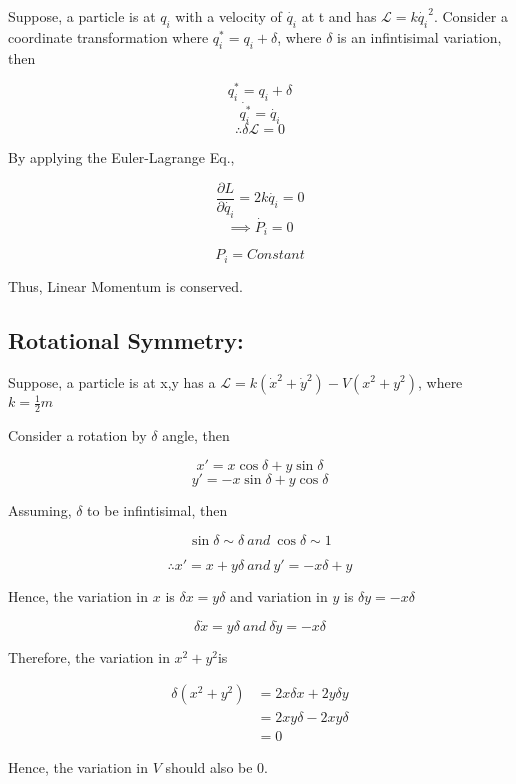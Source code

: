 \documentclass[a4paper]{article}
\newcommand{\Lagr}{\mathcal{L}}
\newcommand{\pdt}[2]{\frac{\partial #1}{\partial #2}}
\newcommand{\half}{\frac{1}{2}}
\begin{document}
			\noindent

			Suppose, a particle is at $q_i$ with a velocity of $\dot{q_i}$ at t and has $\Lagr = k\dot{q_i}^2$.
			Consider a coordinate transformation where $q_i^* = q_i + \delta$, where $\delta$ is an infintisimal variation, then
			
			$$ q_i^* = q_i + \delta $$
			$$ \dot{q_i^*} = \dot{q_i} $$
			$$\therefore \delta \Lagr = 0 $$

			By applying the Euler-Lagrange Eq., 

			$$ \pdt{L}{\dot{q_i}} = 2k\dot{q_i} = 0 $$
			$$\implies \dot{P_i} = 0 $$

			$$ P_i = Constant $$

			Thus, Linear Momentum is conserved.

		\subsection*{Rotational Symmetry: }

			\noindent

			Suppose, a particle is at x,y has a $\Lagr = k (\dot{x}^2 + \dot{y}^2) - V(x^2 + y^2)$, where $ k = \half m $	

			Consider a rotation by $\delta$ angle, then

			$$ x' = x\cos{\delta} + y\sin{\delta} $$
			$$ y' = -x\sin{\delta} + y\cos{\delta} $$

			Assuming, $\delta$ to be infintisimal, then

			$$ \sin{\delta} \sim \delta\ and\ \cos{\delta} \sim 1 $$

			$$\therefore x' = x + y\delta\ and\ y' = -x\delta + y $$

			Hence, the variation in $x$ is $\delta x = y \delta$ and variation in $y$ is $\delta y = -x \delta $

			$$ \delta \dot{x} = y \delta\ and\ \delta \dot{y} = - x \delta $$

			Therefore, the variation in $x^2 + y^2$is
			
			\begin{equation}
				\begin{split}	
					\delta (x^2 + y^2) & = 2 x \delta x + 2y \delta y \\
					&= 2 x y \delta - 2 x y \delta  \\
					& = 0
				\end{split}
			\end{equation}
			
			Hence, the variation in $V$ should also be $0$.
\end{document}
